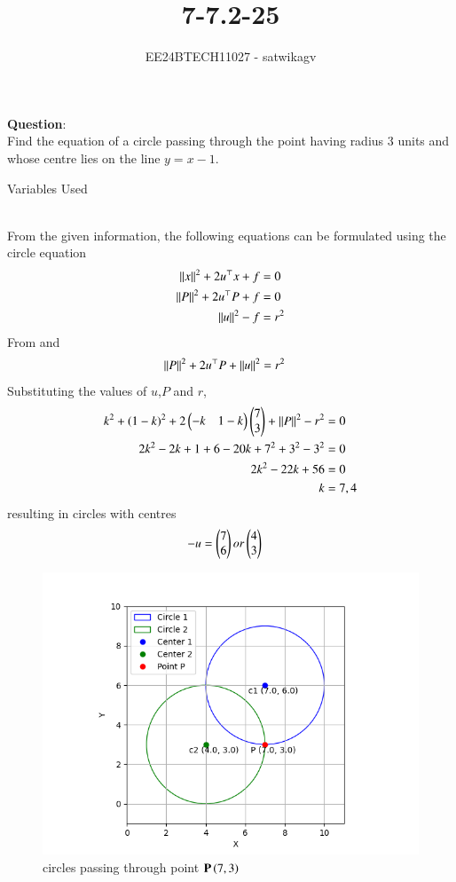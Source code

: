 \documentclass[journal]{IEEEtran}
\begin{document}

\vspace{3cm}

\title{7-7.2-25}
\author{EE24BTECH11027 - satwikagv}
{\let\newpage\relax\maketitle}

\renewcommand{\thefigure}{\theenumi}
\renewcommand{\thetable}{\theenumi}
\setlength{\intextsep}{10pt} %


\renewcommand{\thetable}{\theenumi}
\textbf{Question}:\\
Find the equation of a circle passing through the point  having radius 3 units and whose centre lies on the line $y=x-1$.\\
\solution
\begin{table}[h!]    
  \centering
  
  \caption{Variables Used}
\end{table}
\\From the given information, the following equations can be formulated using the circle equation 
\begin{align}
	\left\lVert x\right\rVert^2 + 2u^\top x + f &= 0\\
	\left\lVert P\right\rVert^2 + 2u^\top P + f &= 0\\
	\left\lVert u\right\rVert^2 - f &= r^2
\end{align}
From  and 
\begin{align}
	\left\lVert P\right\rVert^2 + 2u^\top P + \left\lVert u\right\rVert^2 &= r^2 	
\end{align}
Substituting the values of $u$,$P$ and $r$,
\begin{align}
	k^2+(1-k)^2+2\begin{pmatrix}-k&1-k\end{pmatrix}\begin{pmatrix}7\\3\end{pmatrix}+\left\lVert P\right\rVert^2-r^2 &= 0\\
	2k^2-2k+1+6-20k+7^2+3^2-3^2 &=0\\
	2k^2-22k+56 &=0\\
	k &=7,4
\end{align}
resulting in circles with centres 
\begin{align}
	-u&=\begin{pmatrix}7\\6\end{pmatrix} or \begin{pmatrix}4\\3\end{pmatrix}	
\end{align}
\begin{figure}[h!]
   \centering
   \includegraphics[width=0.7\linewidth]{figs/circle_plot.png}
   \caption{circles passing through point $\mathbf{P}\left(7,3\right)$}
\end{figure}
\end{document}

